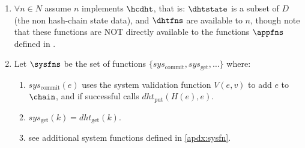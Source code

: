 \documentclass[twocolumn,showpacs,%
  nofootinbib,aps,superscriptaddress,%
  eqsecnum,prd,notitlepage,showkeys,10pt]{revtex4-1}
\begin{document}
\begin{enumerate}
\begin{enumerate}
\item \label{hc:shards} Allow every node $n$ to discard every $\delta_x \in \dhtstate_n$ if the number of closer (with regards to $d(x,y)$) nodes
\begin{equation}
\rho_x=\left\vert\{n_i|d(A_{n_i},\delta_{x,key}) < d(A_n,\delta_{x,key}\}\right\vert
\end{equation}
is greater than the  $r$.
Note that this results in the network adapting to changes in topology and DHT state migrations by regulating the number of network-wide redundant copies of all $\delta_i\in\dhtstate$ to match $r$. This implies the existence of $r$ partitions of N called \footnote{This sharding inspired the Holochain name, because if you partition the network it still retains an image of the whole in the same way that cutting a hologram results in each part still containing the whole image.\cite{hologram}} that each (among all their nodes $N_{Shard_i} \subset N$) hold a complete redundant copy of $\dhtstate$ :
\begin{equation}
\bigcup\limits_{n\in N_{Shard_i}} \dhtstate_n = \dhtstate
\end{equation}
\end{enumerate}

Call $\hcdht$ a , ,  DHT.

\item $\forall n \in N$ assume $n$ implements $\hcdht$, that is: $\dhtstate$ is a subset of $D$ (the non hash-chain state data), and $\dhtfns$ are available to $n$, though note that these functions are NOT directly available to the functions $\appfns$ defined in \hcdna.

\item Let $\sysfns$ be the set of functions $\{sys_\text{commit},sys_\text{get}, \dots\}$ where:
\begin{enumerate}
\item $sys_\text{commit}(e)$ uses the system validation function $V(e,v)$ to add $e$ to $\chain$, and if successful calls $dht_\text{put}(H(e),e)$.
\item $sys_\text{get}(k) = dht_\text{get}(k)$.
\item see additional system functions defined in \ref{apdx:sysfn}.
\end{enumerate}


\end{enumerate}
\end{document}
